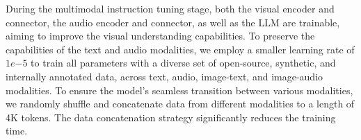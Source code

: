 During the multimodal instruction tuning stage, both the visual encoder and connector, the audio encoder and connector, as well as the LLM are trainable, aiming to improve the visual understanding capabilities. To preserve the capabilities of the text and audio modalities, we employ a smaller learning rate of \(1e{-5}\) to train all parameters with a diverse set of open-source, synthetic, and internally annotated data, across text, audio, image-text, and image-audio modalities.
To ensure the model's seamless transition between various modalities, we randomly shuffle and concatenate data from different modalities to a length of 4K tokens. The data concatenation strategy significantly reduces the training time.
 
